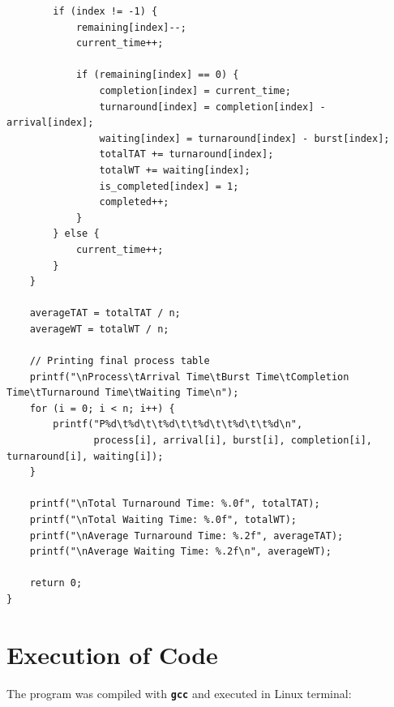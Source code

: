 \documentclass[10pt,a4paper]{article}
\newcommand{\cmd}[1]{\texttt{\textbf{#1}}}
\begin{document}
\begin{lstlisting}
        if (index != -1) {
            remaining[index]--;
            current_time++;

            if (remaining[index] == 0) {
                completion[index] = current_time;
                turnaround[index] = completion[index] - arrival[index];
                waiting[index] = turnaround[index] - burst[index];
                totalTAT += turnaround[index];
                totalWT += waiting[index];
                is_completed[index] = 1;
                completed++;
            }
        } else {
            current_time++;
        }
    }

    averageTAT = totalTAT / n;
    averageWT = totalWT / n;

    // Printing final process table
    printf("\nProcess\tArrival Time\tBurst Time\tCompletion Time\tTurnaround Time\tWaiting Time\n");
    for (i = 0; i < n; i++) {
        printf("P%d\t%d\t\t%d\t\t%d\t\t%d\t\t%d\n",
               process[i], arrival[i], burst[i], completion[i], turnaround[i], waiting[i]);
    }

    printf("\nTotal Turnaround Time: %.0f", totalTAT);
    printf("\nTotal Waiting Time: %.0f", totalWT);
    printf("\nAverage Turnaround Time: %.2f", averageTAT);
    printf("\nAverage Waiting Time: %.2f\n", averageWT);

    return 0;
}
\end{lstlisting}

\section{Execution of Code}
The program was compiled with \cmd{gcc} and executed in Linux terminal:
\end{document}
